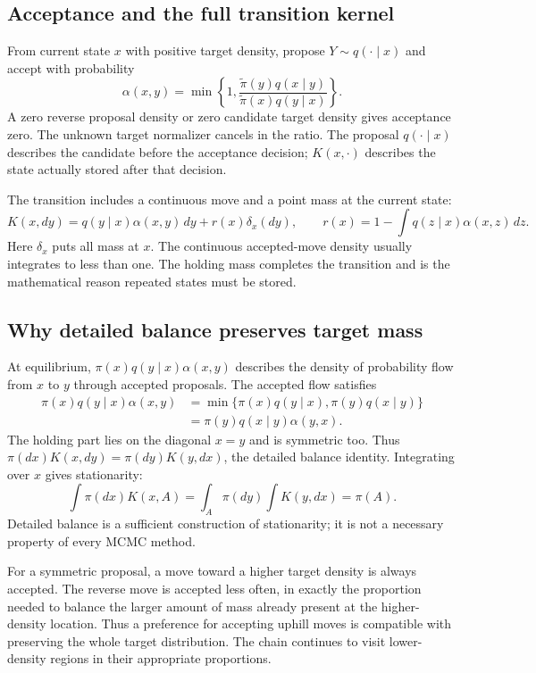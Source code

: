 \documentclass[11pt,a4paper]{article}
\begin{document}
\subsection{Acceptance and the full transition kernel}
From current state $x$ with positive target density, propose
$Y\sim q(\cdot\mid x)$ and accept with probability
\[
 \alpha(x,y)=\min\left\{1,
 \frac{\widetilde\pi(y)q(x\mid y)}
      {\widetilde\pi(x)q(y\mid x)}\right\}.
\]
A zero reverse proposal density or zero candidate target density gives
acceptance zero. The unknown target normalizer cancels in the ratio.
The proposal $q(\cdot\mid x)$ describes the candidate before the acceptance
decision; $K(x,\cdot)$ describes the state actually stored after that decision.

The transition includes a continuous move and a point mass at the current
state:
\[
 K(x,dy)=q(y\mid x)\alpha(x,y)\,dy+r(x)\delta_x(dy),\qquad
 r(x)=1-\int q(z\mid x)\alpha(x,z)\,dz.
\]
Here $\delta_x$ puts all mass at $x$. The continuous accepted-move density
usually integrates to less than one. The holding mass completes the transition
and is the mathematical reason repeated states must be stored.

\subsection{Why detailed balance preserves target mass}
At equilibrium, $\pi(x)q(y\mid x)\alpha(x,y)$ describes the density of
probability flow from $x$ to $y$ through accepted proposals.
The accepted flow satisfies
\begin{align*}
 \pi(x)q(y\mid x)\alpha(x,y)
 &=\min\{\pi(x)q(y\mid x),\pi(y)q(x\mid y)\}\\
 &=\pi(y)q(x\mid y)\alpha(y,x).
\end{align*}
The holding part lies on the diagonal $x=y$ and is symmetric too. Thus
$\pi(dx)K(x,dy)=\pi(dy)K(y,dx)$, the detailed balance identity.
Integrating over $x$ gives stationarity:
\[
 \int\pi(dx)K(x,A)
 =\int_A\pi(dy)\int K(y,dx)=\pi(A).
\]
Detailed balance is a sufficient construction of stationarity; it is not a
necessary property of every MCMC method.

For a symmetric proposal, a move toward a higher target density is always
accepted. The reverse move is accepted less often, in exactly the proportion
needed to balance the larger amount of mass already present at the
higher-density location. Thus a preference for accepting uphill moves is
compatible with preserving the whole target distribution. The chain continues
to visit lower-density regions in their appropriate proportions.
\end{document}

